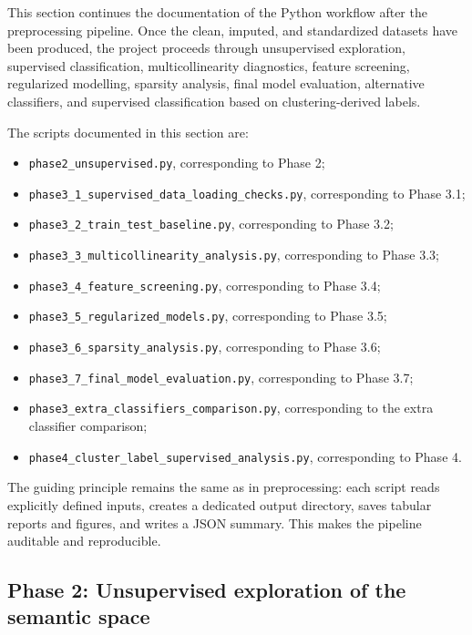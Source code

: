 \documentclass{ipgpmaster}
\begin{document}
This section continues the documentation of the Python workflow after the preprocessing pipeline. Once the clean, imputed, and standardized datasets have been produced, the project proceeds through unsupervised exploration, supervised classification, multicollinearity diagnostics, feature screening, regularized modelling, sparsity analysis, final model evaluation, alternative classifiers, and supervised classification based on clustering-derived labels.

The scripts documented in this section are:

\begin{itemize}
    \item \texttt{phase2\_unsupervised.py}, corresponding to Phase 2;
    \item \texttt{phase3\_1\_supervised\_data\_loading\_checks.py}, corresponding to Phase 3.1;
    \item \texttt{phase3\_2\_train\_test\_baseline.py}, corresponding to Phase 3.2;
    \item \texttt{phase3\_3\_multicollinearity\_analysis.py}, corresponding to Phase 3.3;
    \item \texttt{phase3\_4\_feature\_screening.py}, corresponding to Phase 3.4;
    \item \texttt{phase3\_5\_regularized\_models.py}, corresponding to Phase 3.5;
    \item \texttt{phase3\_6\_sparsity\_analysis.py}, corresponding to Phase 3.6;
    \item \texttt{phase3\_7\_final\_model\_evaluation.py}, corresponding to Phase 3.7;
    \item \texttt{phase3\_extra\_classifiers\_comparison.py}, corresponding to the extra classifier comparison;
    \item \texttt{phase4\_cluster\_label\_supervised\_analysis.py}, corresponding to Phase 4.
\end{itemize}

The guiding principle remains the same as in preprocessing: each script reads explicitly defined inputs, creates a dedicated output directory, saves tabular reports and figures, and writes a JSON summary. This makes the pipeline auditable and reproducible.

\subsection{Phase 2: Unsupervised exploration of the semantic space}
\end{document}
